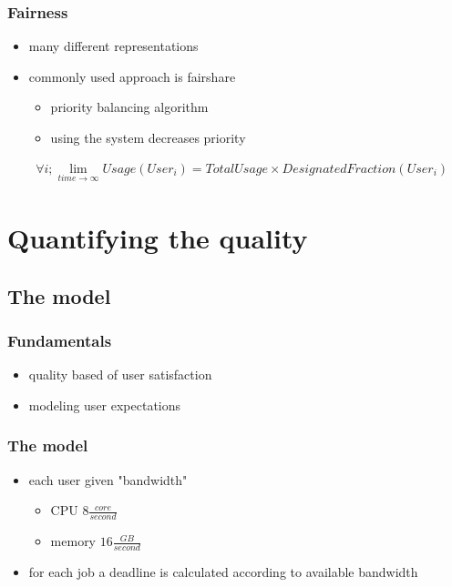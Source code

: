 \begin{frame}
	\frametitle{Fairness}
	\begin{itemize}
		\item many different representations
		\item commonly used approach is fairshare
		\begin{itemize}
			\item priority balancing algorithm
			\item using the system decreases priority
		\end{itemize}
	\end{itemize}

	\begin{align*}
	& \forall i; \lim_{time \to \infty} Usage(User_i) = TotalUsage \times DesignatedFraction(User_i)
	\end{align*}
\end{frame}

\section{Quantifying the quality}
\subsection{The model}


\begin{frame}
	\frametitle{Fundamentals}
	\begin{itemize}
		\item quality based of user satisfaction
		\item modeling user expectations
	\end{itemize}
\end{frame}

\begin{frame}
	\frametitle{The model}
	\begin{itemize}
		\item each user given "bandwidth"
		\begin{itemize}
			\item CPU $8\frac{core}{second}$
			\item memory $16\frac{GB}{second}$
		\end{itemize}
		\item for each job a deadline is calculated according to available bandwidth
	\end{itemize}
\end{frame}

